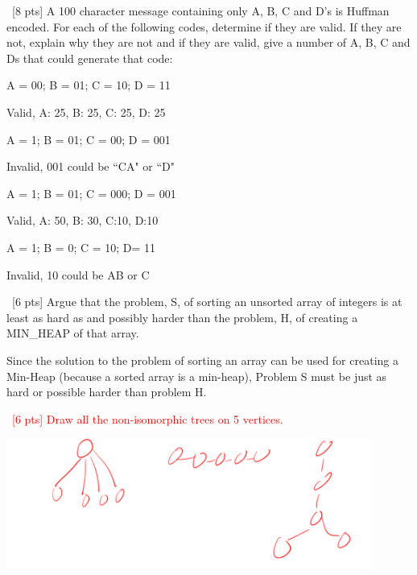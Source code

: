 \documentclass[12pt]{article}
\newenvironment{sol}[1][Solution]{\begin{trivlist}\item[\hskip\labelsep {\bfseries #1:}]}{\end{trivlist}}
\begin{document}
\begin{enumerate}
    \item \ [8 pts] A 100 character message containing only A, B, C and D’s is Huffman encoded. For each of the following codes, determine if they are valid. If they are not, explain why they are not and if they are valid, give a number of A, B, C and Ds that could generate that code:
    \begin{enumerate}
        \item A = 00; B = 01; C = 10; D = 11
        \begin{sol}
        Valid, A: 25, B: 25, C: 25, D: 25
        \end{sol}
        \item A = 1; B = 01; C = 00; D = 001 
        \begin{sol}
            Invalid, 001 could be ``CA" or ``D"
        \end{sol}
        \item A = 1; B = 01; C = 000; D = 001
        \begin{sol}
            Valid, A: 50, B: 30, C:10, D:10
        \end{sol}
        \item A = 1; B = 0; C = 10; D= 11
        \begin{sol}
        Invalid, 10 could be AB or C
        \end{sol}
    \end{enumerate}

    \item \ [6 pts] Argue that the problem, S, of sorting an unsorted array of integers is at least as hard as and possibly harder than the problem, H, of creating a MIN\_HEAP of that array.
    \begin{sol}
    Since the solution to the problem of sorting an array can be used for creating a Min-Heap (because a sorted array is a min-heap), Problem S must be just as hard or possible harder than problem H.
    \end{sol}

    \item \ \textcolor{red}{[6 pts] Draw all the non-isomorphic trees on 5 vertices.}
    \begin{sol}
             \begin{center}
            \includegraphics[width = 0.9\textwidth]{p2.png}
    \end{center}
    \end{sol}


\end{enumerate}
\end{document}
